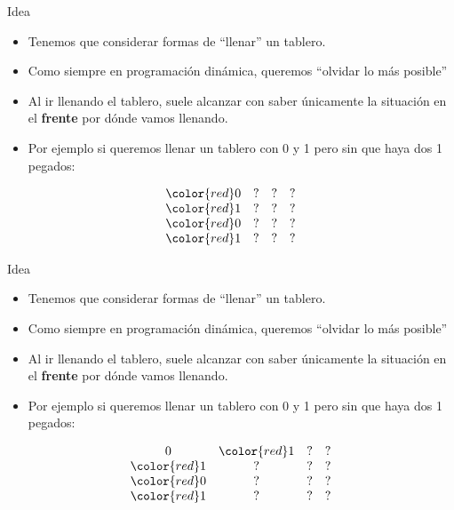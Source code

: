 \documentclass{beamer}
\begin{document}
\begin{frame}{Idea}
    \begin{itemize}
		\item Tenemos que considerar formas de ``llenar'' un tablero.
		\item Como siempre en programación dinámica, queremos ``olvidar lo más posible''
		\item Al ir llenando el tablero, suele alcanzar con saber únicamente la situación en el \textbf{frente} por dónde vamos llenando.
		\item Por ejemplo si queremos llenar un tablero con 0 y 1 pero sin que haya dos 1 pegados:
    \end{itemize}
    $$\begin{array}{cccc}
		\color{red}0 & ? & ? & ? \\
		\color{red}1 & ? & ? & ? \\
		\color{red}0 & ? & ? & ? \\
		\color{red}1 & ? & ? & ? \\
    \end{array}$$
\end{frame}

\begin{frame}{Idea}
    \begin{itemize}
		\item Tenemos que considerar formas de ``llenar'' un tablero.
		\item Como siempre en programación dinámica, queremos ``olvidar lo más posible''
		\item Al ir llenando el tablero, suele alcanzar con saber únicamente la situación en el \textbf{frente} por dónde vamos llenando.
		\item Por ejemplo si queremos llenar un tablero con 0 y 1 pero sin que haya dos 1 pegados:
    \end{itemize}
    $$\begin{array}{cccc}
		0 & \color{red}1 & ? & ? \\
		\color{red}1 & ? & ? & ? \\
		\color{red}0 & ? & ? & ? \\
		\color{red}1 & ? & ? & ? \\
    \end{array}$$
\end{frame}
\end{document}
